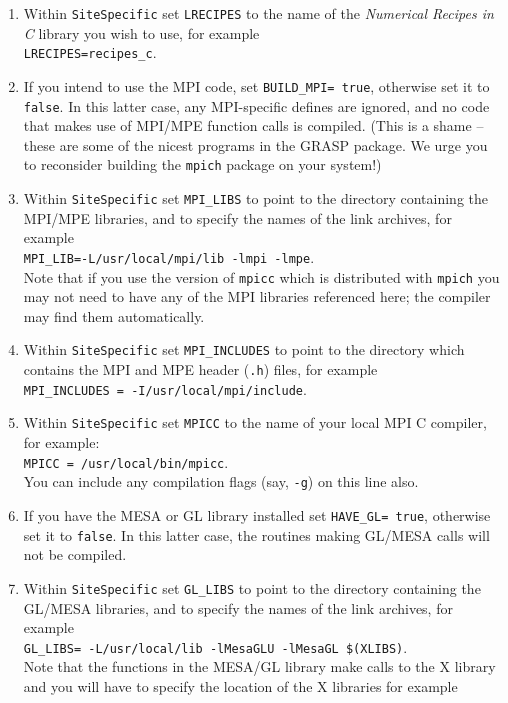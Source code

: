 \begin{enumerate}
\item
Within {\tt SiteSpecific} set {\tt LRECIPES} to the name of the {\it
Numerical Recipes in C} library you wish to use, for example \\
\mbox{\tt LRECIPES=recipes\_c}.
\item
If you intend to use the MPI code, set {\tt BUILD\_MPI= true}, otherwise
set it to {\tt false}.  In this latter case, any MPI-specific defines
are ignored, and no code that makes use of MPI/MPE function calls is
compiled.  (This is a shame -- these are some of the nicest programs in
the GRASP package.  We urge you to reconsider building the {\tt mpich}
package on your system!)
\item
Within {\tt SiteSpecific} set {\tt MPI\_LIBS} to point to the directory
containing the MPI/MPE libraries, and to specify the names of the link
archives, for example\\
\mbox{\tt MPI\_LIB=-L/usr/local/mpi/lib -lmpi -lmpe}.\\
Note that if you use the version of {\tt mpicc} which is distributed
with {\tt mpich} you may not need to have any of the MPI libraries
referenced here; the compiler may find them automatically.
\item
Within {\tt SiteSpecific} set {\tt MPI\_INCLUDES} to point to the
directory which contains the MPI and MPE header ({\tt *.h}) files, for
example\\
\mbox{\tt MPI\_INCLUDES = -I/usr/local/mpi/include}.
\item
Within {\tt SiteSpecific} set {\tt MPICC} to the name of your
local MPI C compiler, for example:\\
\mbox{\tt MPICC = /usr/local/bin/mpicc}.\\
You can include any compilation flags (say, {\tt -g}) on this line also.
\item
If you have the MESA or GL library installed set {\tt HAVE\_GL= true}, otherwise
set it to {\tt false}.  In this latter case, the routines making GL/MESA calls 
will not be compiled. 
\item
Within {\tt SiteSpecific} set {\tt GL\_LIBS} to point to the directory
containing the GL/MESA libraries, and to specify the names of the link
archives, for example\\
\mbox{\tt GL\_LIBS= -L/usr/local/lib -lMesaGLU -lMesaGL \$(XLIBS)}.\\
Note that the functions in the MESA/GL library make calls to the X library
and you will have to specify the location of the X libraries for example\\

\end{enumerate}
